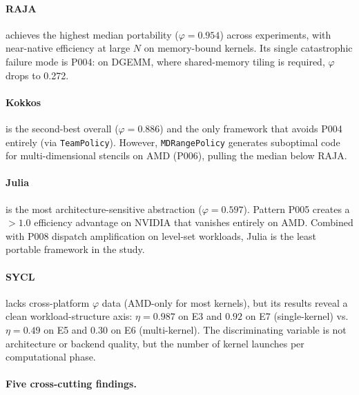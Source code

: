 \paragraph{RAJA} achieves the highest median portability ($\varphi = 0.954$)
across experiments, with near-native efficiency at large $N$ on memory-bound
kernels. Its single catastrophic failure mode is P004: on DGEMM, where
shared-memory tiling is required, $\varphi$ drops to 0.272.

\paragraph{Kokkos} is the second-best overall ($\varphi = 0.886$) and the
only framework that avoids P004 entirely (via \texttt{TeamPolicy}). However,
\texttt{MDRangePolicy} generates suboptimal code for multi-dimensional
stencils on AMD (P006), pulling the median below RAJA.

\paragraph{Julia} is the most architecture-sensitive abstraction
($\varphi = 0.597$). Pattern P005 creates a $> 1.0$ efficiency advantage on
NVIDIA that vanishes entirely on AMD. Combined with P008 dispatch
amplification on level-set workloads, Julia is the least portable framework
in the study.

\paragraph{SYCL} lacks cross-platform $\varphi$ data (AMD-only for most
kernels), but its results reveal a clean workload-structure axis:
$\eta = 0.987$ on E3 and $0.92$ on E7 (single-kernel) vs.\ $\eta = 0.49$
on E5 and $0.30$ on E6 (multi-kernel). The discriminating variable is not
architecture or backend quality, but the number of kernel launches per
computational phase.

\paragraph{Five cross-cutting findings.}

